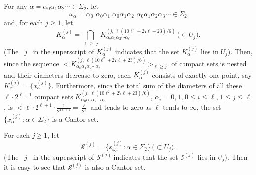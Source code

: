 \documentclass[12pt]{article}
\newcommand{\al}{\alpha}
\begin{document}
\indent For any $\al = \al_0\al_1\al_2 \cdots \in \Sigma_2$, let 
{\large 
$$
\omega_\al = \al_0 \,\, \al_0\al_1 \,\, \al_0\al_1\al_2 \,\, \al_0\al_1\al_2\al_3 \cdots \in \Sigma_2
$$} 
and, for each $j \ge 1$, let 
$$
K_\al^{(j)} = \bigcap_{\ell \, \ge \, j} \, K_{\al_0\al_1\al_2\cdots \al_\ell}^{(j, \, \ell(10\ell^2+27\ell+23)/6)} \, \big(\subset U_j\big).
$$ 
\big(The \, $j$ \, in the superscript of $K_\al^{(j)}$ indicates that the set $K_\al^{(j)}$ lies in $U_j$\big).
Then, since the sequence $< K_{\al_0\al_1\al_2\cdots \al_\ell}^{(j, \, \ell(10\ell^2+27\ell+23)/6)}>_{\ell \ge j}$ of compact sets is nested and their diameters decrease to zero, each $K_\alpha^{(j)}$ consists of exactly one point, say $K_\al^{(j)} = \{ x_\al^{(j)} \}$.  Furthermore, since the total sum of the diameters of all these $\ell \cdot 2^{\ell+1}$ compact sets $K_{\al_0\al_1\al_2\cdots \al_\ell}^{(j, \,\ell(10\ell^2+27\ell+23)/6)}$, $\al_i = 0, 1$, $0 \le i \le \ell$, $1 \le j \le \ell$, is $< \ell \cdot 2^{\ell+1} \cdot \frac 1{2^{2\ell+1}} = \frac \ell{2^\ell}$ and tends to zero as $\ell$ tends to $\infty$, the set $\{ x_\alpha^{(j)} : \alpha \in \Sigma_2 \}$ is a Cantor set.

For each $j \ge 1$, let 
$$
\mathcal S^{(j)} = \{ x_{\omega_\al}^{(j)} : \al \in \Sigma_2 \} \, \big(\subset U_j\big).
$$
\big(The \, $j$ \, in the superscript of $\mathcal S^{(j)}$ indicates that the set $\mathcal S^{(j)}$ lies in $U_j$\big).  Then it is easy to see that $\mathcal S^{(j)}$ is also a Cantor set.  
\end{document}
